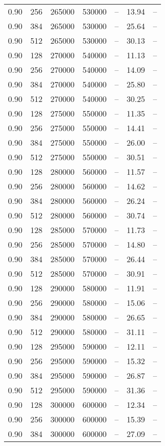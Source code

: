 \begin{tabular}{l|l|l|l|l|l|l}
0.90 & 256 & 265000 & 530000 & -- & 13.94 & --\\
0.90 & 384 & 265000 & 530000 & -- & 25.64 & --\\
0.90 & 512 & 265000 & 530000 & -- & 30.13 & --\\
0.90 & 128 & 270000 & 540000 & -- & 11.13 & --\\
0.90 & 256 & 270000 & 540000 & -- & 14.09 & --\\
0.90 & 384 & 270000 & 540000 & -- & 25.80 & --\\
0.90 & 512 & 270000 & 540000 & -- & 30.25 & --\\
0.90 & 128 & 275000 & 550000 & -- & 11.35 & --\\
0.90 & 256 & 275000 & 550000 & -- & 14.41 & --\\
0.90 & 384 & 275000 & 550000 & -- & 26.00 & --\\
0.90 & 512 & 275000 & 550000 & -- & 30.51 & --\\
0.90 & 128 & 280000 & 560000 & -- & 11.57 & --\\
0.90 & 256 & 280000 & 560000 & -- & 14.62 & --\\
0.90 & 384 & 280000 & 560000 & -- & 26.24 & --\\
0.90 & 512 & 280000 & 560000 & -- & 30.74 & --\\
0.90 & 128 & 285000 & 570000 & -- & 11.73 & --\\
0.90 & 256 & 285000 & 570000 & -- & 14.80 & --\\
0.90 & 384 & 285000 & 570000 & -- & 26.44 & --\\
0.90 & 512 & 285000 & 570000 & -- & 30.91 & --\\
0.90 & 128 & 290000 & 580000 & -- & 11.91 & --\\
0.90 & 256 & 290000 & 580000 & -- & 15.06 & --\\
0.90 & 384 & 290000 & 580000 & -- & 26.65 & --\\
0.90 & 512 & 290000 & 580000 & -- & 31.11 & --\\
0.90 & 128 & 295000 & 590000 & -- & 12.11 & --\\
0.90 & 256 & 295000 & 590000 & -- & 15.32 & --\\
0.90 & 384 & 295000 & 590000 & -- & 26.87 & --\\
0.90 & 512 & 295000 & 590000 & -- & 31.36 & --\\
0.90 & 128 & 300000 & 600000 & -- & 12.34 & --\\
0.90 & 256 & 300000 & 600000 & -- & 15.39 & --\\
0.90 & 384 & 300000 & 600000 & -- & 27.09 & --\\

\end{tabular}
